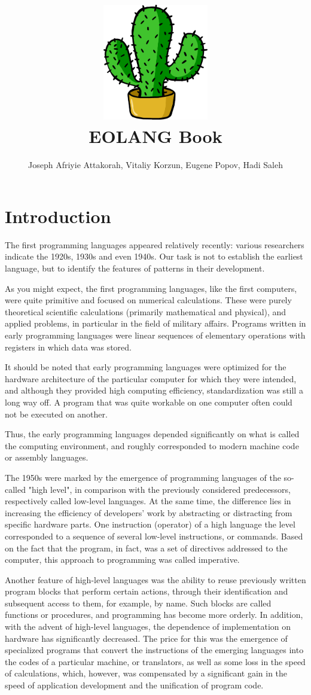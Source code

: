 \documentclass[12pt]{book}
\title{\includegraphics[height=2in]{cactus.pdf} \\[1in] EOLANG Book}
\author{Joseph Afriyie Attakorah,
  Vitaliy Korzun,
  Eugene Popov,
  Hadi Saleh}
\begin{document}
\raggedbottom

\maketitle

\tableofcontents

\chapter{Introduction}
The first programming languages appeared relatively recently: various researchers indicate the 1920s, 1930s and even 1940s. Our task is not to establish the earliest language, but to identify the features of patterns in their development.

As you might expect, the first programming languages, like the first computers, were quite primitive and focused on numerical calculations. These were purely theoretical scientific calculations (primarily mathematical and physical), and applied problems, in particular in the field of military affairs. Programs written in early programming languages were linear sequences of elementary operations with registers in which data was stored.

It should be noted that early programming languages were optimized for the hardware architecture of the particular computer for which they were intended, and  although they provided high computing efficiency, standardization was still a long way off. A program that was quite workable on one computer often could not be executed on another.

Thus, the early programming languages depended significantly on what is called the computing environment, and roughly corresponded to modern machine code or assembly languages.

The 1950s were marked by the emergence of programming languages of the so-called "high level", in comparison with the previously considered predecessors, respectively called low-level languages. At the same time, the difference lies in increasing the efficiency of developers' work by abstracting or distracting from specific hardware parts. One instruction (operator) of a high language the level corresponded to a sequence of several low-level instructions, or commands. Based on the fact that the program, in fact, was a set of directives addressed to the computer, this approach to programming was called imperative.

Another feature of high-level languages was the ability to reuse previously written program blocks that perform certain actions, through their identification and subsequent access to them, for example, by name. Such blocks are called functions or procedures, and programming has become more orderly. In addition, with the advent of high-level languages, the dependence of implementation on hardware has significantly decreased. The price for this was the emergence of specialized programs that convert the instructions of the emerging languages into the codes of a particular machine, or translators, as well as some loss in the speed of calculations, which, however, was compensated by a significant gain in the speed of application development and the unification of program code.
\end{document}
